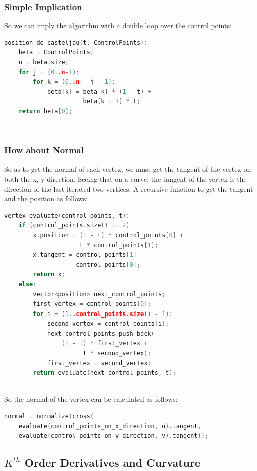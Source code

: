 \documentclass[acmtog]{acmart}
\begin{document}
\subsubsection{Simple Implication}
So we can imply the algorithm with a double loop over the control points:
\begin{lstlisting}[language=C++]
position de_casteljau(t, ControlPoints):
    beta = ControlPoints;
    n = beta.size;
    for j = (0..n-1):
        for k = (0..n - j - 1):
            beta[k] = beta[k] * (1 - t) +
				      beta[k + 1] * t;
    return beta[0];
\end{lstlisting}
\\
\subsubsection{How about Normal}
So as to get the normal of each vertex,
we must get the tangent of the vertex on both the x, y direction.
Seeing that on a curve, the tangent of the vertex is the direction of the last
iterated two vertices.
A recursive function to get the tangent and the position as follows:
\begin{lstlisting}[language=C++]
vertex evaluate(control_points, t):
    if (control_points.size() == 2)
    	x.position = (1 - t) * control_points[0] +
		             t * control_points[1];
        x.tangent = control_points[1] -
		            control_points[0];
        return x;
    else:
        vector<position> next_control_points;
        first_vertex = control_points[0];
        for i = (1..control_points.size() - 1):
            second_vertex = control_points[i];
            next_control_points.push_back(
				(1 - t) * first_vertex +
			          t * second_vertex);
            first_vertex = second_vertex;
        return evaluate(next_control_points, t);
\end{lstlisting}
\\
So the normal of the vertex can be calculated as follows:
\begin{lstlisting}[language=C++]
normal = normalize(cross(
	evaluate(control_points_on_x_direction, u).tangent,
	evaluate(control_points_on_y_direction, v).tangent));
\end{lstlisting}
\subsection{$K^{th}$ Order Derivatives and Curvature}
\end{document}
